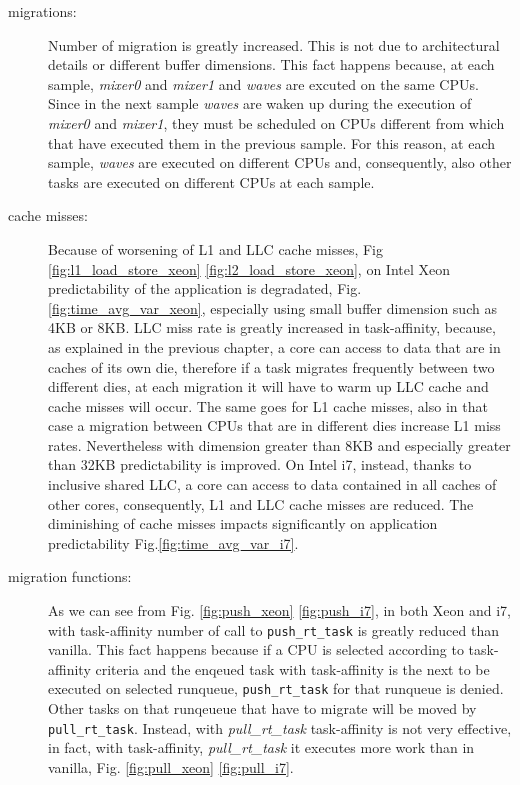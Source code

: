 \begin{description}
\item[migrations:] Number of migration is greatly increased. This is not due to architectural details or different buffer dimensions. This fact happens 
because, at each sample, \textit{mixer0} and \textit{mixer1} and \textit{waves} are excuted on the same CPUs. Since in the next sample \textit{waves} are 
waken up during the execution of \textit{mixer0} and \textit{mixer1}, they must be scheduled on CPUs different from which that have executed them in 
the previous sample. For this reason, at each sample, \textit{waves} are executed on different CPUs and, consequently, also other tasks are executed on 
different CPUs at each sample.

\item[cache misses:] Because of worsening of L1 and LLC cache misses, Fig \ref{fig:l1_load_store_xeon} \ref{fig:l2_load_store_xeon}, on Intel Xeon 
predictability of the application is degradated, Fig. \ref{fig:time_avg_var_xeon}, especially using small buffer dimension such as 4KB or 8KB. LLC miss rate 
is greatly increased in task-affinity, because, as explained in the previous chapter, a core can access to data that are in caches of its own die, 
therefore if a task migrates frequently between two different dies, at each migration it will have to warm up LLC cache and cache misses will occur. The 
same goes for L1 cache misses, also in that case a migration between CPUs that are in different dies increase L1 miss rates. Nevertheless with dimension 
greater than 8KB and especially greater than 32KB predictability is improved. On Intel i7, instead, thanks to inclusive shared LLC, a core can access to 
data contained in all caches of other cores, consequently, L1 and LLC cache misses are reduced. The diminishing of cache misses impacts significantly on 
application predictability Fig.\ref{fig:time_avg_var_i7}.

\item[migration functions:] As we can see from Fig. \ref{fig:push_xeon} \ref{fig:push_i7}, in both Xeon and i7, with task-affinity number of call to 
\texttt{push\_rt\_task} is greatly reduced than vanilla. This fact happens because if a CPU is selected according to task-affinity criteria and the enqeued 
task with task-affinity is the next to be executed on selected runqueue, \texttt{push\_rt\_task} for that runqueue is denied. Other tasks on that runqeueue 
that have to migrate will be moved by \texttt{pull\_rt\_task}. Instead, with \textit{pull\_rt\_task} task-affinity is not very effective, in fact, with 
task-affinity, \textit{pull\_rt\_task} it executes more work than in vanilla, Fig. \ref{fig:pull_xeon} \ref{fig:pull_i7}.


\end{description}
